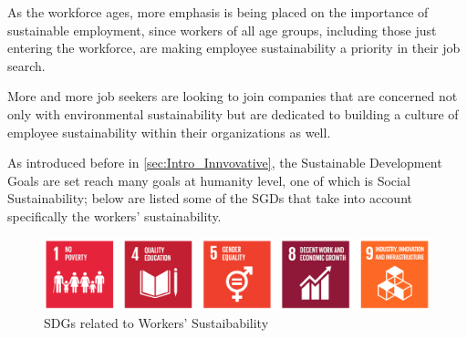 As the workforce ages, more emphasis is being placed on the importance of sustainable employment, since workers of all age groups, including those just entering the workforce, are making employee sustainability a priority in their job search.

More and more job seekers are looking to join companies that are concerned not only with environmental sustainability but are dedicated to building a culture of employee sustainability within their organizations as well.

As introduced before in \ref{sec:Intro_Innvovative}, the Sustainable Development Goals are set reach many goals at humanity level, one of which is Social Sustainability; below are listed some of the SGDs that take into account specifically the workers’ sustainability.

\begin{figure}[h!]
    \centering
    \includegraphics[width=1\textwidth]{Images/Social_sustainability/SGD workers sustainability.PNG}
    \caption{SDGs related to Workers' Sustaibability}
    \label{fig:SDGworksus}
\end{figure}

